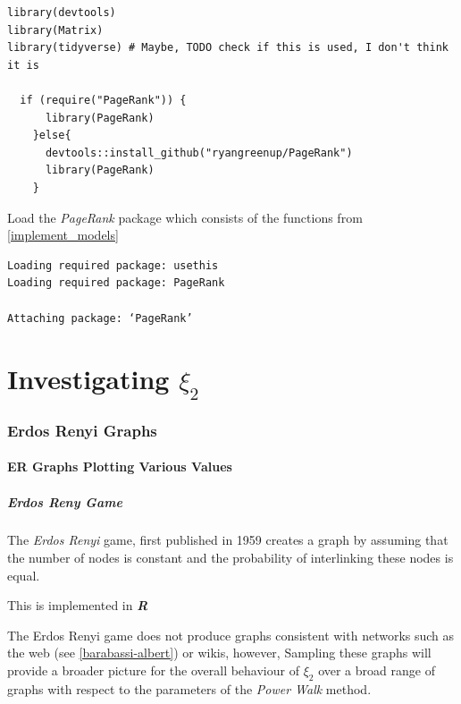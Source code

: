 \documentclass[11pt]{article}
\begin{document}
\begin{listing}[htbp]
\begin{verbatim}
library(devtools)
library(Matrix)
library(tidyverse) # Maybe, TODO check if this is used, I don't think it is

  if (require("PageRank")) {
      library(PageRank)
    }else{
      devtools::install_github("ryangreenup/PageRank")
      library(PageRank)
    }

\end{verbatim}
\caption{\label{}Load the \emph{PageRank} package which consists of the functions from \ref{implement_models}}
\end{listing}

\begin{verbatim}
Loading required package: usethis
Loading required package: PageRank

Attaching package: ‘PageRank’
\end{verbatim}


\part{Investigating \(\xi_{2}\)}
\section{Erdos Renyi Graphs}
\label{second-eigenvalue}
\subsection{ER Graphs Plotting Various Values}
\label{sec:orgadc0d25}
\subsubsection{Erdos Reny Game}
\label{sec:org5dd8c1f}
The \emph{Erdos Renyi} game, first published in 1959 \cite{renyiRandomGraphs1959} creates a graph by assuming that the number of nodes is constant and the probability of interlinking these nodes is equal.

This is implemented in \textbf{\emph{R}} \cite[IgraphManualPagesa]{IgraphManualPages}

The Erdos Renyi game does not produce graphs consistent with networks such as
the web (see \ref{barabassi-albert}) or wikis, however, Sampling these graphs will
provide a broader picture for the overall behaviour of \(\xi_{2}\) over a broad
range of graphs with respect to the parameters of the \emph{Power Walk} method.
\end{document}
